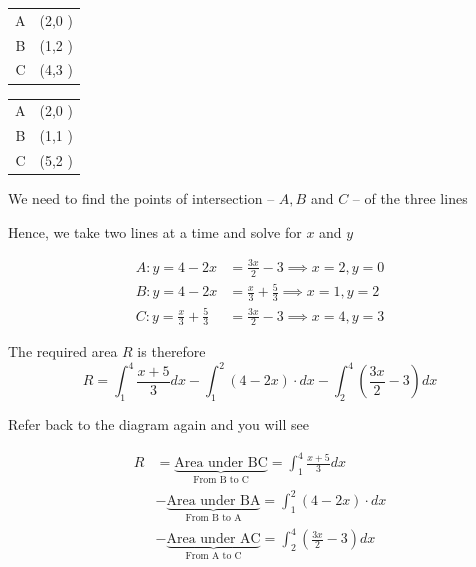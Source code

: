 \documentclass[14pt,fleqn]{extarticle}
\begin{document}
\newcard 

\begin{center}
  \begin{tabular}{NN}
  \toprule 
        &  \\
   \midrule
   A & \left(2,0 \right) \\
   \midrule
   B & \left(1,2 \right)\\
    \midrule 
    C & \left(4,3 \right) \\
    \bottomrule
  \end{tabular}
\end{center}

\newcard 

\begin{center}
  \begin{tabular}{NN}
  \toprule 
        &  \\
   \midrule
   A & \left(2,0 \right) \\
   \midrule
   B & \left(1,1 \right)\\
    \midrule 
    C & \left(5,2 \right) \\
    \bottomrule
  \end{tabular}
\end{center}
\newcard 

We need to find the points of intersection -- $A,B$ and $C$ -- of the three lines \newline 

 Hence, we take two lines at a time and solve for $x$ and $y$ 

\begin{align}
A: y=4-2x &= \frac{3x}{2}-3\implies x = 2, y = 0 \\
B: y=4-2x &= \frac{x}{3}+\frac{5}{3} \implies x = 1, y = 2 \\
C: y = \frac{x}{3}+\frac{5}{3} &= \frac{3x}{2}-3 \implies x = 4,y=3 
\end{align}

\newcard 

The required area $R$ is therefore 
\small\[R = \int_1^4 \frac{x+5}{3}dx - \int_1^2 (4-2x)\cdot dx - \int_2^4 \left( \frac{3x}{2}-3\right)dx\]\normalsize 

\newcard 

Refer back to the diagram again and you will see 

\begin{align}
R &= \underbrace{\text{Area under BC}}_{\text{From B to C}} = \int_1^4 \frac{x+5}{3}dx\\
&- \underbrace{\text{Area under BA}}_{\text{From B to A}}=\int_1^2 (4-2x)\cdot dx \\ 
&- \underbrace{\text{Area under AC}}_{\text{From A to C}}=\int_2^4 \left( \frac{3x}{2}-3\right)dx
\end{align}\newline 
\end{document}
